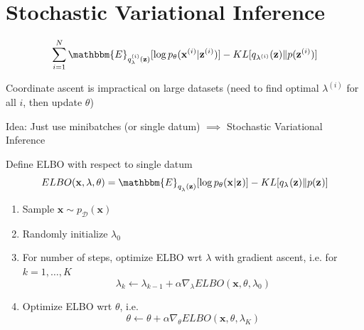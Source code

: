 \documentclass{beamer}
\let\tempone\itemize
\let\temptwo\enditemize
\renewenvironment{itemize}{\tempone\addtolength{\itemsep}{0.5\baselineskip}}{\temptwo}
\newcommand{\zvec}{\mathbf{z}}
\newcommand{\E}{\mathbbm{E}}
\newcommand{\xvec}{\mathbf{x}}
\begin{document}
\section{Stochastic Variational Inference}


\begin{frame}
  \begin{center}
   \end{center}   
   
\[ \sum_{i=1}^N \E_{q_\lambda^{(i)}(\zvec)}[\log  p_\theta(\xvec^{(i)} | \zvec^{(i)}) ] - KL[q_{\lambda^{(i)}}(\zvec) \Vert p(\zvec^{(i)})] \]

\begin{itemize}
\item Coordinate ascent is impractical on large datasets (need to find optimal $\lambda^{(i)}$ for all $i$, then update $\theta$)
\item Idea: Just use minibatches (or single datum) $\implies$ Stochastic Variational Inference
\end{itemize}
\end{frame}

\begin{frame}
  \begin{center}
   \end{center}   
Define ELBO with respect to single datum
\[ ELBO(\xvec, \lambda, \theta) = \E_{q_\lambda^{}(\zvec)}[\log  p_\theta(\xvec^{} | \zvec^{}) ] - KL[q_{\lambda^{}}(\zvec) \Vert p(\zvec^{})] \]

\begin{enumerate}
\item Sample $\xvec \sim p_\mathcal{D}(\xvec)$
\item Randomly initialize $\lambda_0$ 
\item For number of steps, optimize ELBO wrt $\lambda$ with gradient ascent, i.e.
for $k = 1, \dots, K$
\[ \lambda_{k} \leftarrow \lambda_{k-1} + \alpha  \nabla_\lambda ELBO(\xvec, \theta, \lambda_0)\]
\item Optimize ELBO wrt $\theta$, i.e.
\[ \theta \leftarrow \theta + \alpha \nabla_\theta ELBO(\xvec, \theta, \lambda_K)\]
\end{enumerate}
\end{frame}
\end{document}
